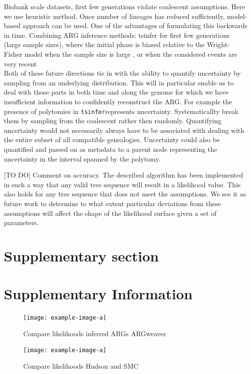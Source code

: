 \documentclass{article}
\newcommand{\tsinfer}[0]{\texttt{tsinfer}}
\newcommand{\supplementarysection}{%
  \setcounter{figure}{0}%
  \let\oldthefigure\thefigure%
  \renewcommand{\thefigure}{S\oldthefigure}%
  \section{Supplementary section}%
}
\begin{document}
Biobank scale datasets, first few generations violate coalescent assumptions. Here we use heuristic 
method. Once number of lineages has reduced sufficiently, model-based approach can be used. One 
of the advantages of formulating this backwards in time. 
Combining ARG inference methods: tsinfer for first few generations (large sample sizes), where 
the initial phase is biased relative to the Wright-Fisher model when the sample size is large 
\citep{bhaskar_distortion_2014}, or when the considered events are very recent \citep{wakeley_gene_2012}\\

Both of these future directions tie in with the ability to quantify uncertainty by sampling 
from an underlying distribution. This will in particular enable us to deal with those 
parts in both time and along the genome for which we have insufficient information to confidently 
reconstruct the ARG. For example the presence of polytomies in \tsinfer represents 
uncertainty. Systematicallty break them by sampling from the coalescent rather then randomly.
Quantifying uncertainty would not necessarily always have to be associated with dealing with 
the entire subset of all compatible genealogies. Uncertainty could also be quantified and passed 
on as metadata to a parent node representing the uncertainty in the interval spanned by the 
polytomy.


[TO DO] Comment on accuracy. The described algorithm has been implemented in such a way that 
any valid tree sequence will result in a likelihood value. This also holds for any tree sequence 
that does not meet the assumptions. We see it as future work to determine to what extent 
particular deviations from these assumptions will affect the shape of the likelihood surface given 
a set of parameters.







\pagebreak 

\supplementarysection
\section*{Supplementary Information}


\begin{figure}[!ht]
\centering
\texttt{[image: example-image-a]}
\caption{Compare likelihoods inferred ARGs ARGweaver}
 \label{sup:fig:vs-argweaver}
\end{figure}


\begin{figure}[!ht]
\centering
\texttt{[image: example-image-a]}
\caption{Compare likelihoods Hudson and SMC}
\label{sup:fig:vs-hudson}
\end{figure}
\end{document}
